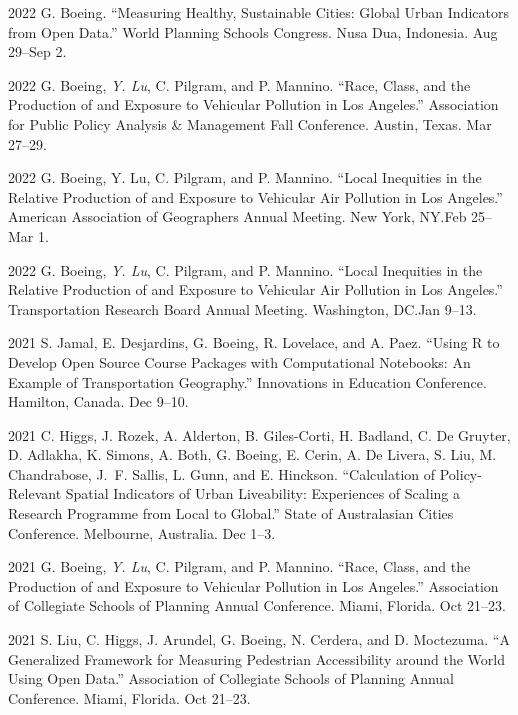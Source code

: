 \documentclass[11pt,letterpaper]{report}
\begin{document}
\begin{tablist}
        \item[2022] \tab{}G. Boeing. \enquote{Measuring Healthy, Sustainable Cities: Global Urban Indicators from Open Data.} World Planning Schools Congress. Nusa Dua, Indonesia. Aug 29--Sep 2.

        \item[2022] \tab{}G. Boeing, \textit{Y. Lu}, C. Pilgram, and P. Mannino. \enquote{Race, Class, and the Production of and Exposure to Vehicular Pollution in Los Angeles.} Association for Public Policy Analysis \& Management Fall Conference. Austin, Texas. Mar 27--29.

        \item[2022] \tab{}G. Boeing, Y. Lu, C. Pilgram, and P. Mannino. \enquote{Local Inequities in the Relative Production of and Exposure to Vehicular Air Pollution in Los Angeles.} American Association of Geographers Annual Meeting. New York, NY.\@ Feb 25--Mar 1.

        \item[2022] \tab{}G. Boeing, \textit{Y. Lu}, C. Pilgram, and P. Mannino. \enquote{Local Inequities in the Relative Production of and Exposure to Vehicular Air Pollution in Los Angeles.} Transportation Research Board Annual Meeting. Washington, DC.\@ Jan 9--13.

        \item[2021] \tab{}S. Jamal, E. Desjardins, G. Boeing, R. Lovelace, and A. Paez. \enquote{Using R to Develop Open Source Course Packages with Computational Notebooks: An Example of Transportation Geography.} Innovations in Education Conference. Hamilton, Canada. Dec 9--10.

        \item[2021] \tab{}C. Higgs, J. Rozek, A. Alderton, B. Giles-Corti, H. Badland, C. De Gruyter, D. Adlakha, K. Simons, A. Both, G. Boeing, E. Cerin, A. De Livera, S. Liu, M. Chandrabose, J.~F. Sallis, L. Gunn, and E. Hinckson. \enquote{Calculation of Policy-Relevant Spatial Indicators of Urban Liveability: Experiences of Scaling a Research Programme from Local to Global.} State of Australasian Cities Conference. Melbourne, Australia. Dec 1--3.

        \item[2021] \tab{}G. Boeing, \textit{Y. Lu}, C. Pilgram, and P. Mannino. \enquote{Race, Class, and the Production of and Exposure to Vehicular Pollution in Los Angeles.} Association of Collegiate Schools of Planning Annual Conference. Miami, Florida. Oct 21--23.

        \item[2021] \tab{}S. Liu, C. Higgs, J. Arundel, G. Boeing, N. Cerdera, and D. Moctezuma. \enquote{A Generalized Framework for Measuring Pedestrian Accessibility around the World Using Open Data.} Association of Collegiate Schools of Planning Annual Conference. Miami, Florida. Oct 21--23.


\end{tablist}
\end{document}
